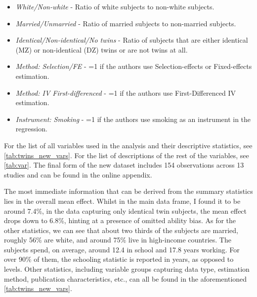 \begin{itemize}
    \item \textit{White/Non-white} - Ratio of white subjects to non-white subjects.
    \item \textit{Married/Unmarried} - Ratio of married subjects to non-married subjects.
    \item \textit{Identical/Non-identical/No twins} - Ratio of subjects that are either identical (MZ) or non-identical (DZ) twins or are not twins at all.
    \item \textit{Method: Selection/FE} - =1 if the authors use  Selection-effects or Fixed-effects estimation.
    \item \textit{Method: IV First-differenced} - =1 if the authors use First-Differenced IV estimation.
    \item \textit{Instrument: Smoking} - =1 if the authors use smoking as an instrument in the regression.
\end{itemize}



For the list of all variables used in the analysis and their descriptive statistics, see \autoref{tab:twins_new_vars}. For the list of descriptions of the rest of the variables, see \autoref{tab:var}. The final form of the new dataset includes 154 observations across 13 studies and can be found in the online appendix.

The most immediate information that can be derived from the summary statistics lies in the overall mean effect. Whilst in the main data frame, I found it to be around 7.4\%, in the data capturing only identical twin subjects, the mean effect drops down to 6.8\%, hinting at a presence of omitted ability bias. As for the other statistics, we can see that about two thirds of the subjects are married, roughly 56\% are white, and around 75\% live in high-income countries. The subjects spend, on average, around 12.4 in school and 17.8 years working. For over 90\% of them, the schooling statistic is reported in years, as opposed to levels. Other statistics, including variable groups capturing data type, estimation method, publication characteristics, etc., can all be found in the aforementioned \autoref{tab:twins_new_vars}.

